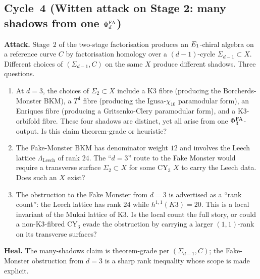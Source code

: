 \subsection*{Cycle~4 (Witten attack on Stage 2: many shadows from one $\Phi^{\mathrm{FA}}_d$)}

\textbf{Attack.} Stage~2 of the two-stage factorisation produces an
$E_1$-chiral algebra on a reference curve $C$ by factorisation homology
over a $(d-1)$-cycle $\Sigma_{d-1} \subset X$. Different choices of
$(\Sigma_{d-1}, C)$ on the same $X$ produce different shadows. Three
questions.
\begin{enumerate}
\item[Q1.] At $d = 3$, the choices of $\Sigma_2 \subset X$ include a
K3 fibre (producing the Borcherds-Monster BKM), a $T^4$ fibre
(producing the Igusa-$\chi_{10}$ paramodular form), an Enriques fibre
(producing a Gritsenko-Clery paramodular form), and a K3-orbifold fibre.
These four shadows are distinct, yet all arise from one
$\Phi^{\mathrm{FA}}_3$-output. Is this claim theorem-grade or heuristic?
\item[Q2.] The Fake-Monster BKM has denominator weight $12$ and
involves the Leech lattice $\Lambda_{\mathrm{Leech}}$ of rank $24$.
The ``$d = 3$'' route to the Fake Monster would require a transverse
surface $\Sigma_2 \subset X$ for some CY$_3$ $X$ to carry the Leech
data. Does such an $X$ exist?
\item[Q3.] The obstruction to the Fake Monster from $d = 3$ is
advertised as a ``rank count'': the Leech lattice has rank $24$ while
$h^{1,1}(K3) = 20$. This is a local invariant of the Mukai lattice of
K3. Is the local count the full story, or could a non-K3-fibred CY$_3$
evade the obstruction by carrying a larger $(1,1)$-rank on its
transverse surfaces?
\end{enumerate}

\textbf{Heal.} The many-shadows claim is theorem-grade per
$(\Sigma_{d-1}, C)$; the Fake-Monster obstruction from $d = 3$ is a
sharp rank inequality whose scope is made explicit.

